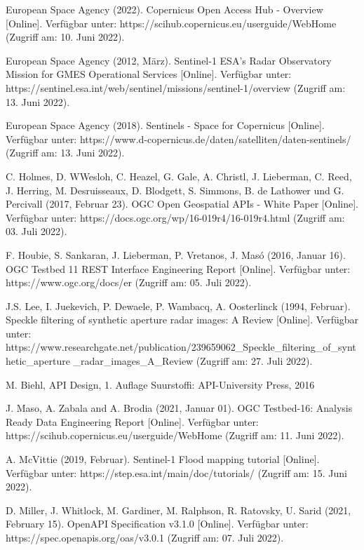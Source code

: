 \begin{thebibliography}{1}
European Space Agency (2022). Copernicus Open Access Hub - Overview [Online]. Verfügbar unter:
https://scihub.copernicus.eu/userguide/WebHome
(Zugriff am: 10. Juni 2022).

European Space Agency (2012, März). Sentinel-1 ESA's Radar Observatory Mission for GMES Operational Services [Online]. Verfügbar unter: 
https://sentinel.esa.int/web/sentinel/missions/sentinel-1/overview
(Zugriff am: 13. Juni 2022).

European Space Agency (2018). Sentinels - Space for Copernicus [Online]. Verfügbar unter: 
https://www.d-copernicus.de/daten/satelliten/daten-sentinels/
(Zugriff am: 13. Juni 2022).

C. Holmes, D. WWesloh, C. Heazel, G. Gale, A. Christl, J. Lieberman, C. Reed, J. Herring, M. Desruisseaux, D. Blodgett, S. Simmons, B. de Lathower und G. Percivall (2017, Februar 23). OGC Open Geospatial APIs - White Paper [Online]. Verfügbar unter: 
https://docs.ogc.org/wp/16-019r4/16-019r4.html
(Zugriff am: 03. Juli 2022).

F. Houbie, S. Sankaran, J. Lieberman, P. Vretanos, J. Masó (2016, Januar 16). OGC Testbed 11 REST Interface Engineering Report [Online]. Verfügbar unter: 
https://www.ogc.org/docs/er
(Zugriff am: 05. Juli 2022).

J.S. Lee, I. Juekevich, P. Dewaele, P. Wambacq, A. Oosterlinck (1994, Februar). Speckle filtering of synthetic aperture radar images: A Review [Online]. Verfügbar unter: 
https://www.researchgate.net/publication/239659062\_Speckle\_filtering\_of\_synthetic\_aperture
\_radar\_images\_A\_Review
(Zugriff am: 27. Juli 2022).

M. Biehl, API Design, 1. Auflage Suurstoffi: API-University Press, 2016

J. Maso, A. Zabala and A. Brodia (2021, Januar 01). OGC Testbed-16: Analysis Ready Data Engineering Report [Online]. Verfügbar unter:
https://scihub.copernicus.eu/userguide/WebHome
(Zugriff am: 11. Juni 2022).

A. McVittie (2019, Februar). Sentinel-1 Flood mapping tutorial [Online]. Verfügbar unter: 
https://step.esa.int/main/doc/tutorials/
(Zugriff am: 15. Juni 2022).

D. Miller, J. Whitlock, M. Gardiner, M. Ralphson, R. Ratovsky, U. Sarid (2021, February 15). OpenAPI Specification v3.1.0 [Online]. Verfügbar unter: 
https://spec.openapis.org/oas/v3.0.1
(Zugriff am: 07. Juli 2022).


\end{thebibliography}
